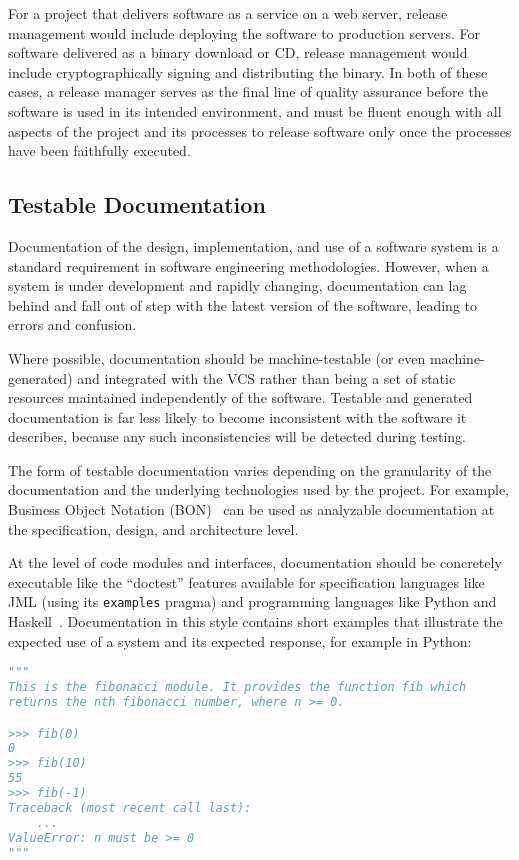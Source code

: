 For a project that delivers software as a service on a web server,
release management would include deploying the software to production
servers. For software delivered as a binary download or CD, release
management would include cryptographically signing and distributing
the binary. In both of these cases, a release manager serves as the
final line of quality assurance before the software is used in its
intended environment, and must be fluent enough with all aspects of
the project and its processes to release software only once the
processes have been faithfully executed.

\subsection{Testable Documentation}

Documentation of the design, implementation, and use of a software
system is a standard requirement in software engineering
methodologies. However, when a system is under development and rapidly
changing, documentation can lag behind and fall out of step with the
latest version of the software, leading to errors and confusion.

Where possible, documentation should be machine-testable (or even
machine-generated) and integrated with the VCS rather than being a set
of static resources maintained independently of the software. Testable
and generated documentation is far less likely to become inconsistent with
the software it describes, because any such inconsistencies will be
detected during testing.

The form of testable documentation varies depending on the granularity
of the documentation and the underlying technologies used by the
project. For example, Business Object Notation
(BON)~\cite{walden1995seamless} can be used as analyzable
documentation at the specification, design, and architecture level.

At the level of code modules and interfaces, documentation should be
concretely executable like the ``doctest'' features available for
specification languages like JML (using its \texttt{examples} pragma)
and programming languages like Python and
Haskell~\cite{python3doctest}. Documentation in this style contains
short examples that illustrate the expected use of a system and its
expected response, for example in Python:

\begin{lstlisting}[language=Python]
"""
This is the fibonacci module. It provides the function fib which
returns the nth fibonacci number, where n >= 0.

>>> fib(0)
0
>>> fib(10)
55
>>> fib(-1)
Traceback (most recent call last):
    ...
ValueError: n must be >= 0
"""
\end{lstlisting}

